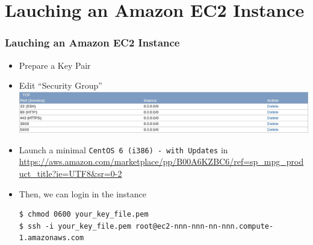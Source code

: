 \documentclass{beamer}
\begin{document}
\section{Lauching an Amazon EC2 Instance}
\begin{frame}
\frametitle{Lauching an Amazon EC2 Instance}

\begin{itemize}
\item Prepare a Key Pair
\item Edit ``Security Group'' \includegraphics[width=1.0 \textwidth]{securitygroup.eps}
\item Launch a minimal \texttt{CentOS 6 (i386) - with Updates} in \url{https://aws.amazon.com/marketplace/pp/B00A6KZBC6/ref=sp_mpg_product_title?ie=UTF8&sr=0-2}
\item Then, we can login in the instance

\lstset{language=shell, escapechar=!}
\begin{lstlisting}[escapechar=!]
$ chmod 0600 your_key_file.pem 
$ ssh -i your_key_file.pem root@ec2-nnn-nnn-nn-nnn.compute-1.amazonaws.com
\end{lstlisting}

\end{itemize}

\end{frame}






\end{document}
